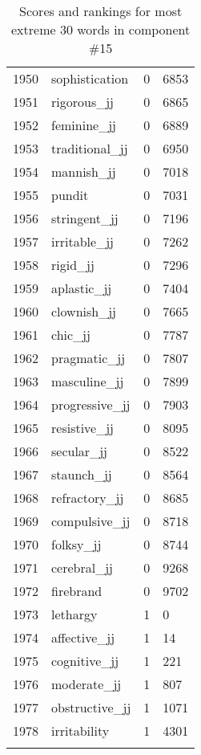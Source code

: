 \begin{longtable}[!htbp]{| rlr@{.}l |}
    1950 & sophistication & 0 & 6853 \\
    1951 & rigorous\_jj & 0 & 6865 \\
    1952 & feminine\_jj & 0 & 6889 \\
    1953 & traditional\_jj & 0 & 6950 \\
    1954 & mannish\_jj & 0 & 7018 \\
    1955 & pundit & 0 & 7031 \\
    1956 & stringent\_jj & 0 & 7196 \\
    1957 & irritable\_jj & 0 & 7262 \\
    1958 & rigid\_jj & 0 & 7296 \\
    1959 & aplastic\_jj & 0 & 7404 \\
    1960 & clownish\_jj & 0 & 7665 \\
    1961 & chic\_jj & 0 & 7787 \\
    1962 & pragmatic\_jj & 0 & 7807 \\
    1963 & masculine\_jj & 0 & 7899 \\
    1964 & progressive\_jj & 0 & 7903 \\
    1965 & resistive\_jj & 0 & 8095 \\
    1966 & secular\_jj & 0 & 8522 \\
    1967 & staunch\_jj & 0 & 8564 \\
    1968 & refractory\_jj & 0 & 8685 \\
    1969 & compulsive\_jj & 0 & 8718 \\
    1970 & folksy\_jj & 0 & 8744 \\
    1971 & cerebral\_jj & 0 & 9268 \\
    1972 & firebrand & 0 & 9702 \\
    1973 & lethargy & 1 & 0 \\
    1974 & affective\_jj & 1 & 14 \\
    1975 & cognitive\_jj & 1 & 221 \\
    1976 & moderate\_jj & 1 & 807 \\
    1977 & obstructive\_jj & 1 & 1071 \\
    1978 & irritability & 1 & 4301 \\
    \hline
    \caption{Scores and rankings for most extreme 30 words in component \#15} \\
\end{longtable}
